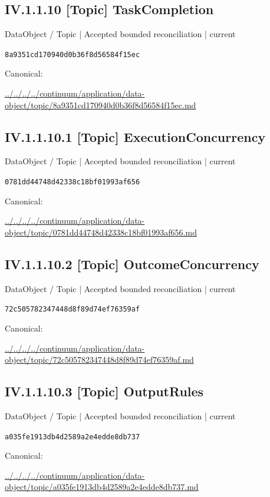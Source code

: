 \documentclass[10pt,a4paper]{article}
\begin{document}
\subsection*{IV.1.1.10 [Topic] TaskCompletion}
{\small DataObject / Topic | Accepted bounded reconciliation | current}\par
\texttt{8a9351cd170940d0b36f8d56584f15ec}\par
Canonical: \par
{\footnotesize\url{../../../../continuum/application/data-object/topic/8a9351cd170940d0b36f8d56584f15ec.md}}\par
\subsection*{IV.1.1.10.1 [Topic] ExecutionConcurrency}
{\small DataObject / Topic | Accepted bounded reconciliation | current}\par
\texttt{0781dd44748d42338c18bf01993af656}\par
Canonical: \par
{\footnotesize\url{../../../../continuum/application/data-object/topic/0781dd44748d42338c18bf01993af656.md}}\par
\subsection*{IV.1.1.10.2 [Topic] OutcomeConcurrency}
{\small DataObject / Topic | Accepted bounded reconciliation | current}\par
\texttt{72c505782347448d8f89d74ef76359af}\par
Canonical: \par
{\footnotesize\url{../../../../continuum/application/data-object/topic/72c505782347448d8f89d74ef76359af.md}}\par
\subsection*{IV.1.1.10.3 [Topic] OutputRules}
{\small DataObject / Topic | Accepted bounded reconciliation | current}\par
\texttt{a035fe1913db4d2589a2e4edde8db737}\par
Canonical: \par
{\footnotesize\url{../../../../continuum/application/data-object/topic/a035fe1913db4d2589a2e4edde8db737.md}}\par
\end{document}
